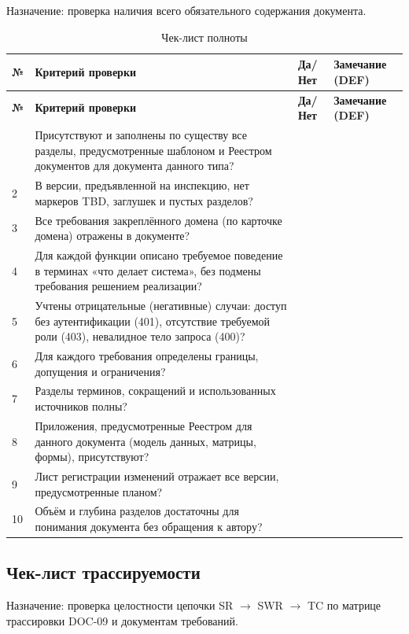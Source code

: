 \documentclass[12pt,a4paper]{article}
\begin{document}
Назначение: проверка наличия всего обязательного содержания документа.

\begin{longtable}{|p{0.8cm}|p{6.3cm}|p{1.8cm}|p{5.2cm}|}
\caption{Чек-лист полноты}\\
\hline
\textbf{№} & \textbf{Критерий проверки} & \textbf{Да/Нет} & \textbf{Замечание (DEF)} \\
\hline
\endfirsthead
\hline
\textbf{№} & \textbf{Критерий проверки} & \textbf{Да/Нет} & \textbf{Замечание (DEF)} \\
\hline
\endhead
\hline
\endfoot
\hline
\endlastfoot
1 & Присутствуют и заполнены по существу все разделы, предусмотренные шаблоном и Реестром документов для документа данного типа? & & \\
\hline
2 & В версии, предъявленной на инспекцию, нет маркеров TBD, заглушек и пустых разделов? & & \\
\hline
3 & Все требования закреплённого домена (по карточке домена) отражены в документе? & & \\
\hline
4 & Для каждой функции описано требуемое поведение в терминах «что делает система», без подмены требования решением реализации? & & \\
\hline
5 & Учтены отрицательные (негативные) случаи: доступ без аутентификации (401), отсутствие требуемой роли (403), невалидное тело запроса (400)? & & \\
\hline
6 & Для каждого требования определены границы, допущения и ограничения? & & \\
\hline
7 & Разделы терминов, сокращений и использованных источников полны? & & \\
\hline
8 & Приложения, предусмотренные Реестром для данного документа (модель данных, матрицы, формы), присутствуют? & & \\
\hline
9 & Лист регистрации изменений отражает все версии, предусмотренные планом? & & \\
\hline
10 & Объём и глубина разделов достаточны для понимания документа без обращения к автору? & & \\
\hline
\end{longtable}

\subsection{Чек-лист трассируемости}

Назначение: проверка целостности цепочки SR $\to$ SWR $\to$ TC по матрице
трассировки DOC-09 и документам требований.
\end{document}
